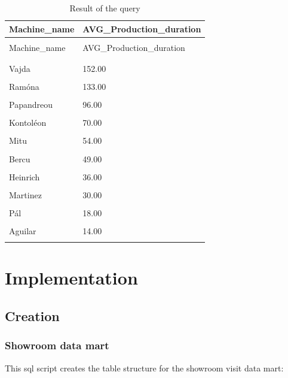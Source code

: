 \documentclass[letterpaper,12pt]{article}
\begin{document}
\begingroup
\renewcommand\arraystretch{0.5}
\begin{longtable}{p{3cm}p{4cm}}
        \caption{Result of the query} \\
        Machine\_name & AVG\_Production\_duration \\
        \endfirsthead \\
        Machine\_name & AVG\_Production\_duration \\
        \endhead \\
        \hline \\
        Vajda & 152.00 \\
        \hline \\
        \color{red} Ramóna & 133.00 \\
        \hline \\
        Papandreou & 96.00 \\
        \hline \\
        Kontoléon & 70.00 \\
        \hline \\
        Mitu & 54.00 \\
        \hline \\
        Bercu & 49.00 \\
        \hline \\
        Heinrich & 36.00 \\
        \hline \\
        Martinez & 30.00 \\
        \hline \\
        Pál & 18.00 \\
        \hline \\
        Aguilar & 14.00 \\
        \hline \\
\end{longtable} 
\endgroup

\section{Implementation}


\subsection{Creation}

\subsubsection{Showroom data mart}
This sql script creates the table structure for the showroom visit data mart:
\end{document}
